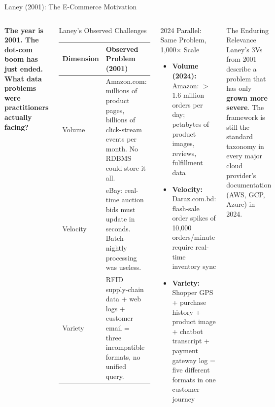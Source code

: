 \documentclass[aspectratio=169,10pt]{beamer}
\begin{document}
\begin{frame}{Laney (2001): The E-Commerce Motivation}
  \begin{columns}[T]
      \textbf{The year is 2001.  The dot-com boom has just ended.  What data problems were practitioners actually facing?}
      \vspace{8pt}
      \begin{block}{Laney's Observed Challenges}
        \renewcommand{\arraystretch}{1.3}
        \begin{tabular}{p{1.8cm}p{4.2cm}}
          \toprule
          \textbf{Dimension} & \textbf{Observed Problem (2001)} \\
          \midrule
          Volume   & Amazon.com: millions of product pages, billions of click-stream events per month.  No RDBMS could store it all. \\
          Velocity & eBay: real-time auction bids must update in seconds.  Batch-nightly processing was useless. \\
          Variety  & RFID supply-chain data + web logs + customer email = three incompatible formats, no unified query. \\
          \bottomrule
        \end{tabular}
      \end{block}

      \begin{exampleblock}{2024 Parallel: Same Problem, 1{,}000$\times$ Scale}
        \begin{itemize}
          \item \textbf{Volume (2024):} Amazon: $>$1.6 million orders per day; petabytes of product images, reviews, fulfillment data
          \item \textbf{Velocity:} Daraz.com.bd: flash-sale order spikes of 10{,}000 orders/minute require real-time inventory sync
          \item \textbf{Variety:} Shopper GPS + purchase history + product image + chatbot transcript + payment gateway log = five different formats in one customer journey
        \end{itemize}
      \end{exampleblock}
      \vspace{4pt}
      \begin{alertblock}{The Enduring Relevance}
        Laney's 3Vs from 2001 describe a problem that has only \textbf{grown more severe}. The framework is still the standard taxonomy in every major cloud provider's documentation (AWS, GCP, Azure) in 2024.
      \end{alertblock}
  \end{columns}
\end{frame}
\end{document}
